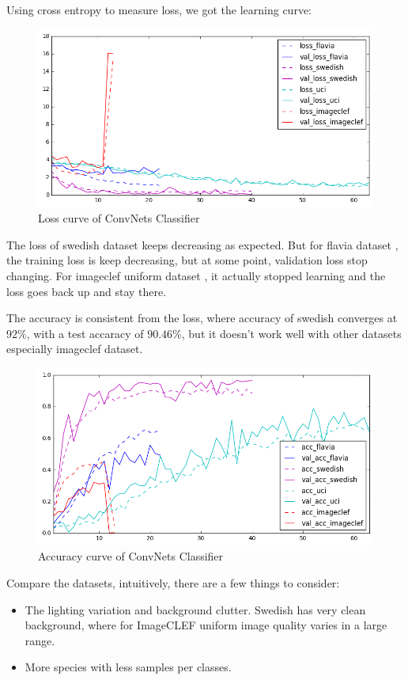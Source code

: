 \documentclass[journal, 10pt]{IEEEtran}
\begin{document}
  Using cross entropy to measure loss, we got the learning curve:
  \begin{figure}[H]
    \centering
    \includegraphics[scale=0.4]{cnn_loss}
    \caption{Loss curve of ConvNets Classifier}
    \label{cnn_loss}
  \end{figure}
  The loss of swedish dataset \cite{SwedishLeafDataset} keeps decreasing as expected. But for flavia dataset \cite{FlaviaDataset}, the training loss is keep decreasing, but at some point, validation loss stop changing. For imageclef uniform dataset \cite{ImageCLEF2013}, it actually stopped learning and the loss goes back up and stay there.

  The accuracy is consistent from the loss, where accuracy of swedish converges at $92\%$, with a test accaracy of $90.46\%$, but it doesn't work well with other datasets especially imageclef dataset.
  \begin{figure}[H]
    \centering
    \includegraphics[scale=0.4]{cnn_acc}
    \caption{\label{fig:cnn_acc} Accuracy curve of ConvNets Classifier}
    \label{cnn_acc}
  \end{figure}

  Compare the datasets, intuitively, there are a few things to consider:
  \begin{itemize}
    \item The lighting variation and background clutter. Swedish has very clean background, where for ImageCLEF uniform image quality varies in a large range.
    \item More species with less samples per classes.
  \end{itemize}
\end{document}
